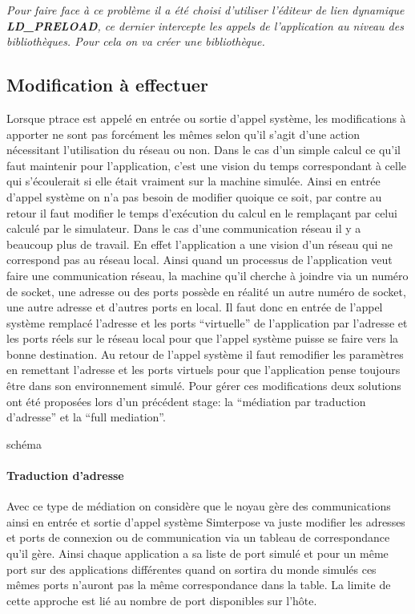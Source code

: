 \textit{Pour faire face à ce problème il a été choisi d'utiliser l'éditeur de
  lien dynamique \textbf{LD\_PRELOAD}, ce dernier intercepte les appels de
  l'application au niveau des bibliothèques. Pour cela on va créer une
  bibliothèque.}

\subsection{Modification à effectuer}
Lorsque ptrace est appelé en entrée ou sortie d'appel système, les modifications
à apporter ne sont pas forcément les mêmes selon qu'il s'agit d'une action
nécessitant l'utilisation du réseau ou non. Dans le cas d'un simple calcul ce
qu'il faut maintenir pour l'application, c'est une vision du temps correspondant
à celle qui s'écoulerait si elle était vraiment sur la machine simulée. Ainsi en
entrée d'appel système on n'a pas besoin de modifier quoique ce soit, par contre
au retour il faut modifier le temps d'exécution du calcul en le remplaçant par
celui calculé par le simulateur. Dans le cas d'une communication réseau il y a
beaucoup plus de travail. En effet l'application a une vision d'un réseau qui ne
correspond pas au réseau local. Ainsi quand un processus de l'application veut
faire une communication réseau, la machine qu'il cherche à joindre via un numéro de socket, une
adresse ou des ports possède en réalité un autre numéro de socket, une autre adresse et d'autres ports en
local. Il faut donc en entrée de l'appel système remplacé l'adresse et les ports
``virtuelle'' de l'application par l'adresse et les ports réels sur le réseau local pour que l'appel système
puisse se faire vers la bonne destination. Au retour de l'appel système il
faut remodifier les paramètres en remettant l'adresse et les ports virtuels pour que l'application pense toujours être dans son
environnement simulé. Pour gérer ces modifications deux solutions ont été
proposées lors d'un précédent stage: la ``médiation par traduction d'adresse''
et la ``full mediation''.

{\color{red}schéma}
\paragraph{Traduction d'adresse} Avec ce type de médiation on considère que le noyau gère des communications ainsi en entrée et sortie d'appel système Simterpose va juste modifier les adresses et ports de connexion ou de communication via un tableau de correspondance qu'il gère. Ainsi chaque application a sa liste de port simulé et pour un même port sur des applications différentes quand on sortira du monde simulés ces mêmes ports n'auront pas la même correspondance dans la table. La limite de cette approche est lié au nombre de port disponibles sur l'hôte.

